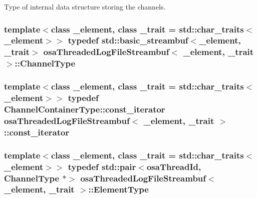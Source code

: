 Type of internal data structure storing the channels. \hypertarget{classosa_threaded_log_file_streambuf_a216ca33908152519430e5456e828805f}{
\subsubsection[{Channel\-Type}]{\setlength{\rightskip}{0pt plus 5cm}template$<$class \-\_\-element, class \-\_\-trait = std\-::char\-\_\-traits$<$\-\_\-element$>$$>$ typedef std\-::basic\-\_\-streambuf$<$\-\_\-element, \-\_\-trait$>$ {\bf osa\-Threaded\-Log\-File\-Streambuf}$<$ \-\_\-element, \-\_\-trait $>$\-::{\bf Channel\-Type}}}\label{classosa_threaded_log_file_streambuf_a216ca33908152519430e5456e828805f}
\hypertarget{classosa_threaded_log_file_streambuf_ae7f904ba3ba23106eb4821db7db66a26}{
\subsubsection[{const\-\_\-iterator}]{\setlength{\rightskip}{0pt plus 5cm}template$<$class \-\_\-element, class \-\_\-trait = std\-::char\-\_\-traits$<$\-\_\-element$>$$>$ typedef Channel\-Container\-Type\-::const\-\_\-iterator {\bf osa\-Threaded\-Log\-File\-Streambuf}$<$ \-\_\-element, \-\_\-trait $>$\-::{\bf const\-\_\-iterator}}}\label{classosa_threaded_log_file_streambuf_ae7f904ba3ba23106eb4821db7db66a26}
\hypertarget{classosa_threaded_log_file_streambuf_afe93c480e5a97ccc96aa3027a8c15ed5}{
\subsubsection[{Element\-Type}]{\setlength{\rightskip}{0pt plus 5cm}template$<$class \-\_\-element, class \-\_\-trait = std\-::char\-\_\-traits$<$\-\_\-element$>$$>$ typedef std\-::pair$<${\bf osa\-Thread\-Id}, {\bf Channel\-Type} $\ast$$>$ {\bf osa\-Threaded\-Log\-File\-Streambuf}$<$ \-\_\-element, \-\_\-trait $>$\-::{\bf Element\-Type}}}\label{classosa_threaded_log_file_streambuf_afe93c480e5a97ccc96aa3027a8c15ed5}
